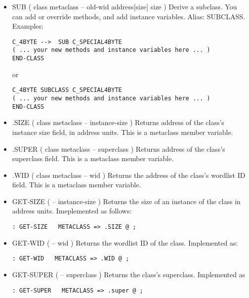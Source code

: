 \begin{;stlisting}[frame=single]
\begin{itemize}[noitemsep]
	\item SUB ( class metaclass -- old-wid address[size] size )\newline
	Derive a subclass. You can add or override methods, and add
	instance variables. Alias: SUBCLASS. Examples:
\begin{lstlisting}[frame=single]
C_4BYTE -->  SUB C_SPECIAL4BYTE
( ... your new methods and instance variables here ... )
END-CLASS
\end{lstlisting}
	or
\begin{lstlisting}[frame=single]
C_4BYTE SUBCLASS C_SPECIAL4BYTE
( ... your new methods and instance variables here ... )
END-CLASS
\end{lstlisting}

	\item .SIZE ( class metaclass -- instance-size )\newline
	Returns address of the class's instance size field, in address
	units. This is a metaclass member variable.

	\item .SUPER ( class metaclass -- superclass )\newline
	Returns address of the class's superclass field. This is a
	metaclass member variable.

	\item .WID ( class metaclass -- wid )\newline
	Returns the address of the class's wordlist ID field. This is a
	metaclass member variable.

	\item GET-SIZE ( -- instance-size )\newline
	Returns the size of an instance of the class in address units.
	Imeplemented as follows:
\begin{lstlisting}[frame=single]
: GET-SIZE   METACLASS => .SIZE @ ;
\end{lstlisting}

	\item GET-WID ( -- wid )\newline
	Returns the wordlist ID of the class. Implemented as:
\begin{lstlisting}[frame=single]
: GET-WID   METACLASS => .WID @ ;
\end{lstlisting}

	\item GET-SUPER ( -- superclass )\newline
	Returns the class's superclass. Implemented as
\begin{lstlisting}[frame=single]
: GET-SUPER   METACLASS => .super @ ;
\end{lstlisting}


\end{itemize}
\end{;stlisting}
